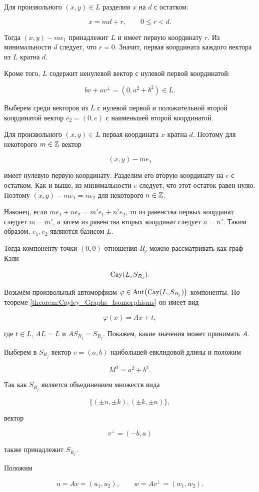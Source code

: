 Для произвольного $(x,y)\in L$ разделим $x$ на $d$ с остатком:

$$x=md+r,\qquad 0\leq r<d.$$

Тогда $(x,y)-me_1$ принадлежит $L$ и имеет первую координату $r$. Из
минимальности $d$ следует, что $r=0$. Значит, первая координата каждого
вектора из $L$ кратна $d$.

Кроме того, $L$ содержит ненулевой вектор с нулевой первой координатой:

$$bv+av^\perp=(0,a^2+b^2)\in L.$$

Выберем среди векторов из $L$ с нулевой первой и положительной второй
координатой вектор $e_2=(0,e)$ с наименьшей второй координатой.

Для произвольного $(x,y)\in L$ первая координата $x$ кратна $d$. Поэтому для
некоторого $m\in\mathbb{Z}$ вектор

$$(x,y)-me_1$$

имеет нулевую первую координату. Разделим его вторую координату на $e$ с
остатком. Как и выше, из минимальности $e$ следует, что этот остаток равен
нулю. Поэтому $(x,y)-me_1=ne_2$ для некоторого $n\in\mathbb{Z}$.

Наконец, если $me_1+ne_2=m'e_1+n'e_2$, то из равенства первых координат
следует $m=m'$, а затем из равенства вторых координат следует $n=n'$.
Таким образом, $e_1,e_2$ являются базисом $L$.

Тогда компоненту точки $(0,0)$ отношения $R_j$ можно рассматривать как граф
Кэли

$$\operatorname{Cay}(L,S_{R_j}).$$

Возьмём произвольный автоморфизм
$\varphi\in\operatorname{Aut}\bigl(\operatorname{Cay}(L,S_{R_j})\bigr)$ компоненты. По теореме
\ref{theorem:Cayley_Graphs_Isomorphisms} он имеет вид

$$\varphi(x)=Ax+t,$$

где $t\in L$, $AL=L$ и $AS_{R_j}=S_{R_j}$. Покажем, какие значения может
принимать $A$.

Выберем в $S_{R_j}$ вектор $v=(a,b)$ наибольшей евклидовой длины и положим

$$M^2=a^2+b^2.$$

Так как $S_{R_j}$ является объединением множеств вида

$$\{(\pm n,\pm k),(\pm k,\pm n)\},$$

вектор

$$v^\perp=(-b,a)$$

также принадлежит $S_{R_j}$.

Положим

$$u=Av=(u_1,u_2),\qquad w=Av^\perp=(w_1,w_2).$$

